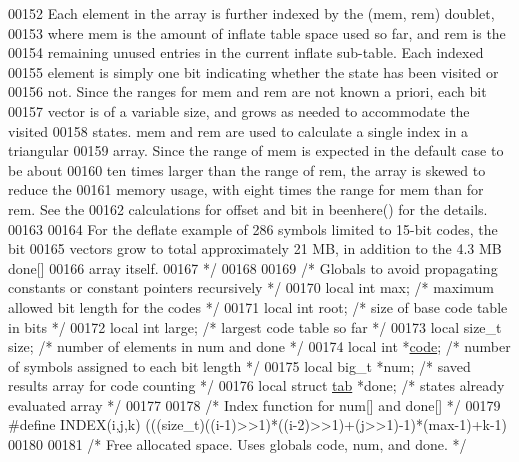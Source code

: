 \begin{DoxyCode}
00152 \textcolor{comment}{   Each element in the array is further indexed by the (mem, rem) doublet,}
00153 \textcolor{comment}{   where mem is the amount of inflate table space used so far, and rem is the}
00154 \textcolor{comment}{   remaining unused entries in the current inflate sub-table.  Each indexed}
00155 \textcolor{comment}{   element is simply one bit indicating whether the state has been visited or}
00156 \textcolor{comment}{   not.  Since the ranges for mem and rem are not known a priori, each bit}
00157 \textcolor{comment}{   vector is of a variable size, and grows as needed to accommodate the visited}
00158 \textcolor{comment}{   states.  mem and rem are used to calculate a single index in a triangular}
00159 \textcolor{comment}{   array.  Since the range of mem is expected in the default case to be about}
00160 \textcolor{comment}{   ten times larger than the range of rem, the array is skewed to reduce the}
00161 \textcolor{comment}{   memory usage, with eight times the range for mem than for rem.  See the}
00162 \textcolor{comment}{   calculations for offset and bit in beenhere() for the details.}
00163 \textcolor{comment}{}
00164 \textcolor{comment}{   For the deflate example of 286 symbols limited to 15-bit codes, the bit}
00165 \textcolor{comment}{   vectors grow to total approximately 21 MB, in addition to the 4.3 MB done[]}
00166 \textcolor{comment}{   array itself.}
00167 \textcolor{comment}{ */}
00168 
00169 \textcolor{comment}{/* Globals to avoid propagating constants or constant pointers recursively */}
00170 local \textcolor{keywordtype}{int} max;          \textcolor{comment}{/* maximum allowed bit length for the codes */}
00171 local \textcolor{keywordtype}{int} root;         \textcolor{comment}{/* size of base code table in bits */}
00172 local \textcolor{keywordtype}{int} large;        \textcolor{comment}{/* largest code table so far */}
00173 local \textcolor{keywordtype}{size\_t} size;      \textcolor{comment}{/* number of elements in num and done */}
00174 local \textcolor{keywordtype}{int} *\hyperlink{structcode}{code};        \textcolor{comment}{/* number of symbols assigned to each bit length */}
00175 local big\_t *num;       \textcolor{comment}{/* saved results array for code counting */}
00176 local \textcolor{keyword}{struct }\hyperlink{structtab}{tab} *done; \textcolor{comment}{/* states already evaluated array */}
00177 
00178 \textcolor{comment}{/* Index function for num[] and done[] */}
00179 \textcolor{preprocessor}{#define INDEX(i,j,k) (((size\_t)((i-1)>>1)*((i-2)>>1)+(j>>1)-1)*(max-1)+k-1)}
00180 
00181 \textcolor{comment}{/* Free allocated space.  Uses globals code, num, and done. */}

\end{DoxyCode}
